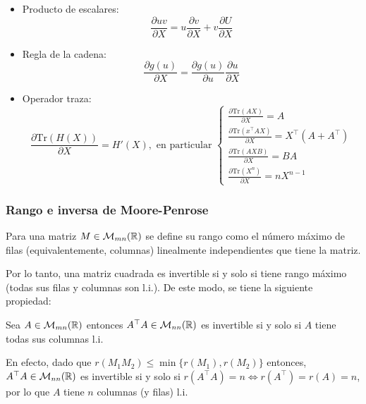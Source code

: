 \begin{itemize}
	\item Producto de escalares:
	\begin{equation}
		\frac{\partial uv}{\partial X} = u\frac{\partial v}{\partial X} + v\frac{\partial U}{\partial X}
	\end{equation}
	
	\item Regla de la cadena:
	\begin{equation}
		\frac{\partial g(u)}{\partial X} = \frac{\partial g(u)}{\partial u} \frac{\partial u}{\partial X}
	\end{equation}
	
	\item Operador traza:
	\begin{equation}
		\frac{\partial \text{Tr}(H(X))}{\partial X} = H'(X),	\text{ en particular } \begin{cases}
			\frac{\partial \text{Tr}(AX)}{\partial X} = A\\
			\frac{\partial \text{Tr}(x^\top A X)}{\partial X} = X^\top(A+A^\top)\\
			\frac{\partial \text{Tr}(AXB)}{\partial X} = BA\\
			\frac{\partial \text{Tr}(X^n)}{\partial X} = nX^{n-1}
		\end{cases}
		\end{equation}
\end{itemize}

\subsubsection{Rango e inversa de Moore-Penrose}

\begin{definition}[rango]
	Para una matriz $M\in\mathcal{M}_{mn}(\mathbb{R})$ se define su rango como el número máximo de filas (equivalentemente, columnas) linealmente independientes que tiene la matriz.
\end{definition}

Por lo tanto, una matriz cuadrada es invertible si y solo si tiene rango máximo (todas sus filas y columnas son l.i.). De este modo, se tiene la siguiente propiedad:

\begin{lemma}
	Sea $A\in\mathcal{M}_{mn}(\mathbb{R})$ entonces $A^\top A \in\mathcal{M}_{nn}(\mathbb{R})$ es invertible si y solo si $A$ tiene todas sus columnas l.i.
\end{lemma}

En efecto, dado que $r(M_1M_2)\leq\min\{r(M_1),r(M_2)\}$ entonces, $A^\top A \in\mathcal{M}_{nn}(\mathbb{R})$ es invertible si y solo si $r(A^\top A)=n\iff r(A^\top )=r(A)=n$, por lo que $A$ tiene $n$ columnas (y filas) l.i.\\

